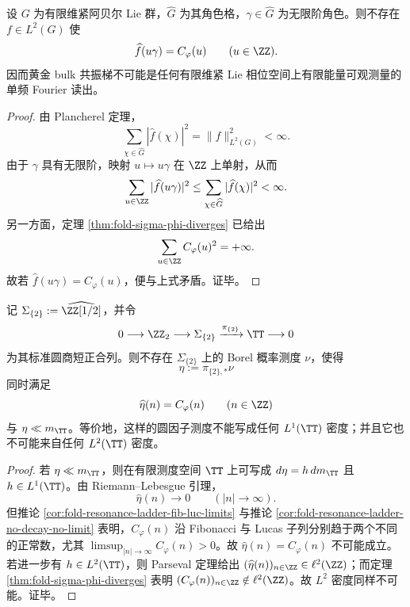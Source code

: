 \begin{theorem}\label{thm:xi-time-part9w-lie-phase-l2-resonance-readout-obstruction}
设 \(G\) 为有限维紧阿贝尔 Lie 群，\(\widehat G\) 为其角色格，\(\gamma\in\widehat G\) 为无限阶角色。则不存在 \(f\in L^2(G)\) 使
\[
\widehat f(u\gamma)=C_\varphi(u)\qquad(u\in\ZZ).
\]
因而黄金 bulk 共振梯不可能是任何有限维紧 Lie 相位空间上有限能量可观测量的单频 Fourier 读出。
\end{theorem}
\begin{proof}
由 Plancherel 定理，
\[
\sum_{\chi\in\widehat G}|\widehat f(\chi)|^2=\|f\|_{L^2(G)}^2<\infty.
\]
由于 \(\gamma\) 具有无限阶，映射 \(u\mapsto u\gamma\) 在 \(\ZZ\) 上单射，从而
\[
\sum_{u\in\ZZ}|\widehat f(u\gamma)|^2\le \sum_{\chi\in\widehat G}|\widehat f(\chi)|^2<\infty.
\]
另一方面，定理 \ref{thm:fold-sigma-phi-diverges} 已给出
\[
\sum_{u\in\ZZ}C_\varphi(u)^2=+\infty.
\]
故若 \(\widehat f(u\gamma)=C_\varphi(u)\)，便与上式矛盾。证毕。
\end{proof}

\begin{corollary}\label{cor:xi-time-part9w-dyadic-solenoid-circle-factor-nonac}
记 \(\Sigma_{\{2\}}:=\widehat{\ZZ[1/2]}\)，并令
\[
0\longrightarrow \ZZ_2\longrightarrow \Sigma_{\{2\}}
\xrightarrow{\pi_{\{2\}}}\TT\longrightarrow 0
\]
为其标准圆商短正合列。则不存在 \(\Sigma_{\{2\}}\) 上的 Borel 概率测度 \(\nu\)，使得
\[
\eta:=\pi_{\{2\},*}\nu
\]
同时满足
\[
\widehat\eta(n)=C_\varphi(n)\qquad(n\in\ZZ)
\]
与 \(\eta\ll m_{\TT}\)。等价地，这样的圆因子测度不能写成任何 \(L^1(\TT)\) 密度；并且它也不可能来自任何 \(L^2(\TT)\) 密度。
\end{corollary}
\begin{proof}
若 \(\eta\ll m_{\TT}\)，则在有限测度空间 \(\TT\) 上可写成 \(d\eta=h\,dm_{\TT}\) 且 \(h\in L^1(\TT)\)。由 Riemann--Lebesgue 引理，
\[
\widehat\eta(n)\longrightarrow 0 \qquad (|n|\to\infty).
\]
但推论 \ref{cor:fold-resonance-ladder-fib-luc-limits} 与推论 \ref{cor:fold-resonance-ladder-no-decay-no-limit} 表明，\(C_\varphi(n)\) 沿 Fibonacci 与 Lucas 子列分别趋于两个不同的正常数，尤其 \(\limsup_{|n|\to\infty}C_\varphi(n)>0\)。故 \(\widehat\eta(n)=C_\varphi(n)\) 不可能成立。
若进一步有 \(h\in L^2(\TT)\)，则 Parseval 定理给出 \((\widehat\eta(n))_{n\in\ZZ}\in\ell^2(\ZZ)\)；而定理 \ref{thm:fold-sigma-phi-diverges} 表明 \((C_\varphi(n))_{n\in\ZZ}\notin\ell^2(\ZZ)\)。故 \(L^2\) 密度同样不可能。证毕。
\end{proof}

